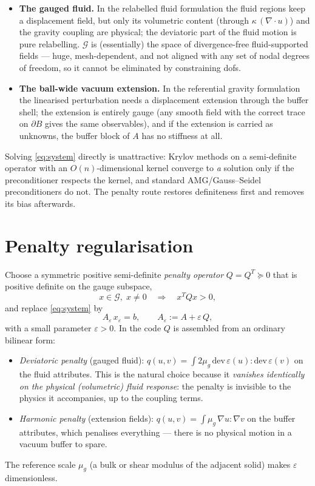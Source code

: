 \documentclass[11pt]{article}
\newcommand{\eps}{\varepsilon}
\begin{document}
\begin{itemize}
\item \textbf{The gauged fluid.} In the relabelled fluid formulation the
  fluid regions keep a displacement field, but only its volumetric
  content (through $\kappa\,(\nabla\!\cdot u)$) and the gravity coupling
  are physical; the deviatoric part of the fluid motion is pure
  relabelling. $\mathcal{G}$ is (essentially) the space of
  divergence-free fluid-supported fields --- huge, mesh-dependent, and
  not aligned with any set of nodal degrees of freedom, so it cannot be
  eliminated by constraining dofs.
\item \textbf{The ball-wide vacuum extension.} In the referential
  gravity formulation the linearised perturbation needs a displacement
  extension through the buffer shell; the extension is entirely gauge
  (any smooth field with the correct trace on $\partial B$ gives the
  same observables), and if the extension is carried as unknowns, the
  buffer block of $A$ has no stiffness at all.
\end{itemize}

Solving \eqref{eq:system} directly is unattractive: Krylov methods on a
semi-definite operator with an $O(n)$-dimensional kernel converge to
\emph{a} solution only if the preconditioner respects the kernel, and
standard AMG/Gauss--Seidel preconditioners do not. The penalty route
restores definiteness first and removes its bias afterwards.

\section{Penalty regularisation}

Choose a symmetric positive semi-definite \emph{penalty operator}
$Q = Q^{T} \succeq 0$ that is positive definite on the gauge subspace,
\begin{equation}
  x \in \mathcal{G}, \; x \neq 0 \quad\Longrightarrow\quad x^{T} Q x > 0 ,
\end{equation}
and replace \eqref{eq:system} by
\begin{equation}
  A_{\eps}\, x_{\eps} = b, \qquad A_{\eps} := A + \eps\, Q ,
  \label{eq:penalised}
\end{equation}
with a small parameter $\eps > 0$. In the code $Q$ is assembled from an
ordinary bilinear form:
\begin{itemize}
\item \emph{Deviatoric penalty} (gauged fluid):
  $q(u,v) = \int 2\mu_{g}\, \mathrm{dev}\,\varepsilon(u) :
  \mathrm{dev}\,\varepsilon(v)$ on the fluid attributes. This is the
  natural choice because it \emph{vanishes identically on the physical
  (volumetric) fluid response}: the penalty is invisible to the physics
  it accompanies, up to the coupling terms.
\item \emph{Harmonic penalty} (extension fields):
  $q(u,v) = \int \mu_{g}\, \nabla u : \nabla v$ on the buffer
  attributes, which penalises everything --- there is no physical motion
  in a vacuum buffer to spare.
\end{itemize}
The reference scale $\mu_{g}$ (a bulk or shear modulus of the adjacent
solid) makes $\eps$ dimensionless.
\end{document}
